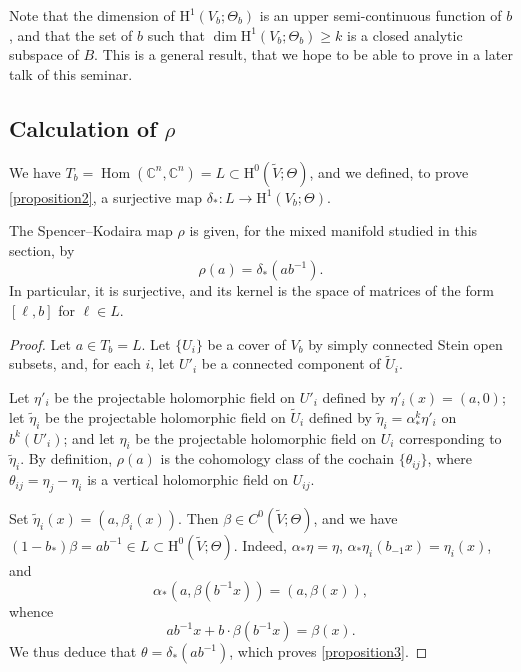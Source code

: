 \documentclass{article}
\theoremstyle{plain}
\newenvironment{proposition}[1]
    {\renewcommand\theinnercustomproposition{#1}\innercustomproposition}
    {\endinnercustomproposition}
\theoremstyle{definition}
\newcommand{\CC}{\mathbb{C}}
\newcommand{\HH}{\mathrm{H}}
\DeclareMathOperator{\Hom}{Hom}
\renewcommand{\geq}{\geqslant}
\newcommand{\oldpage}[1]{\marginpar{\footnotesize$\Big\vert$ \textit{p.~#1}}}
\begin{document}
Note that the dimension of $\HH^1(V_b;\Theta_b)$ is an upper semi-continuous function of $b$, and that the set of $b$ such that $\dim\HH^1(V_b;\Theta_b)\geq k$ is a closed analytic subspace of $B$.
This is a general result, that we hope to be able to prove in a later talk of this seminar.


\subsection{Calculation of \texorpdfstring{$\rho$}{p}}
\label{III.3}

We have $T_b=\Hom(\CC^n,\CC^n)=L\subset\HH^0(\widetilde{V};\Theta)$, and we defined, to prove \cref{proposition2}, a surjective map $\delta_*\colon L\to\HH^1(V_b;\Theta)$.

\begin{proposition}{3}
\label{proposition3}
  The Spencer--Kodaira map $\rho$ is given, for the mixed manifold studied in this section, by
  \[
    \rho(a) = \delta_*(ab^{-1}).
  \]
  In particular, it is surjective, and its kernel is the space of matrices of the form $[\ell,b]$ for $\ell\in L$.
\end{proposition}

\begin{proof}
  Let $a\in T_b=L$.
  Let $\{U_i\}$ be a cover of $V_b$ by simply connected Stein open subsets, and, for each $i$, let $U'_i$ be a connected component of $\widetilde{U}_i$.

  Let $\eta'_i$ be the projectable holomorphic field on $U'_i$ defined by $\eta'_i(x)=(a,0)$;
  let $\widetilde{\eta}_i$ be the projectable holomorphic field on $\widetilde{U
  }_i$ defined by $\widetilde{\eta}_i=\alpha_*^k\eta'_i$ on $b^k(U'_i)$;
  and let $\eta_i$ be the projectable holomorphic field on $U_i$ corresponding to $\widetilde{\eta}_i$.
  By definition, $\rho(a)$ is the cohomology class of the cochain $\{\theta_{ij}\}$, where $\theta_{ij}=\eta_j-\eta_i$ is a vertical holomorphic field on $U_{ij}$.

\oldpage{3-07}
  Set $\widetilde{\eta}_i(x)=(a,\beta_i(x))$.
  Then $\beta\in C^0(\widetilde{V};\Theta)$, and we have $(1-b_*)\beta=ab^{-1}\in L\subset\HH^0(\widetilde{V};\Theta)$.
  Indeed, $\alpha_*\eta=\eta$, $\alpha_*\eta_i(b_{-1}x)=\eta_i(x)$, and
  \[
    \alpha_*(a,\beta(b^{-1}x)) = (a,\beta(x)),
  \]
  whence
  \[
    ab^{-1}x + b\cdot\beta(b^{-1}x) = \beta(x).
  \]
  We thus deduce that $\theta=\delta_*(ab^{-1})$, which proves \cref{proposition3}.
\end{proof}
\end{document}
